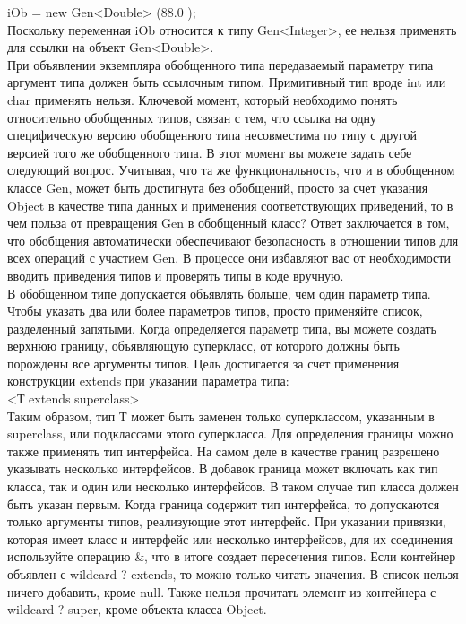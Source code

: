 iOb = new Gen<Double> (88.0 ); \\
Поскольку переменная iOb относится к типу Gen<Integer>, ее нельзя применять для ссылки на объект Gen<Double>. \\
При объявлении экземпляра обобщенного типа передаваемый параметру типа аргумент типа должен быть ссылочным типом. Примитивный тип вроде int или char применять нельзя. Ключевой момент, который необходимо понять относительно обобщенных типов, связан с тем, что ссылка на одну специфическую версию обобщенного типа несовместима по типу с другой версией того же обобщенного типа. В этот момент вы можете задать себе следующий вопрос. Учитывая, что та же функциональность, что и в обобщенном классе Gen, может быть достигнута без обобщений, просто за счет указания Object в качестве типа данных и применения соответствующих приведений, то в чем польза от превращения Gen в обобщенный класс? Ответ заключается в том, что обобщения автоматически обеспечивают безопасность в отношении типов для всех операций с участием Gen. В процессе они избавляют вас от необходимости вводить приведения типов и проверять типы в коде вручную. \\
В обобщенном типе допускается объявлять больше, чем один параметр типа. Чтобы указать два или более параметров типов, просто применяйте список, разделенный запятыми. Когда определяется параметр типа, вы можете создать верхнюю границу, объявляющую суперкласс, от которого должны быть порождены все аргументы типов. Цель достигается за счет применения конструкции extends при указании параметра типа: \\
<Т extends superclass> \\
Таким образом, тип Т может быть заменен только суперклассом, указанным в superclass, или подклассами этого суперкласса. Для определения границы можно также применять тип интерфейса. На самом деле в качестве границ разрешено указывать несколько интерфейсов. В добавок граница может включать как тип класса, так и один или несколько интерфейсов. В таком случае тип класса должен быть указан первым. Когда граница содержит тип интерфейса, то допускаются только аргументы типов, реализующие этот интерфейс. При указании привязки, которая имеет класс и интерфейс или несколько интерфейсов, для их соединения используйте операцию \&, что в итоге создает пересечения типов. Если контейнер объявлен с wildcard ? extends, то можно только читать значения. В список нельзя ничего добавить, кроме null. Также нельзя прочитать элемент из контейнера с wildcard ? super, кроме объекта класса Object.\\
